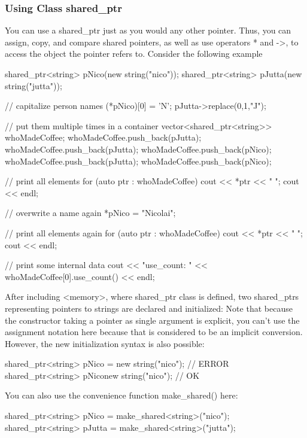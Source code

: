 \documentclass{report}
\begin{document}
\subsubsection{Using Class shared\_ptr}
\bigbreak \noindent 
You can use a shared\_ptr just as you would any other pointer. Thus, you can assign, copy, and
compare shared pointers, as well as use operators * and ->, to access the object the pointer refers to.
Consider the following example
\bigbreak \noindent 
\begin{cppcode}
    shared_ptr<string> pNico(new string("nico"));
    shared_ptr<string> pJutta(new string("jutta"));

    // capitalize person names
    (*pNico)[0] = 'N';
    pJutta->replace(0,1,"J");

    // put them multiple times in a container
    vector<shared_ptr<string>> whoMadeCoffee;
    whoMadeCoffee.push_back(pJutta);
    whoMadeCoffee.push_back(pJutta);
    whoMadeCoffee.push_back(pNico);
    whoMadeCoffee.push_back(pJutta);
    whoMadeCoffee.push_back(pNico);

    // print all elements
    for (auto ptr : whoMadeCoffee) {
        cout << *ptr << " ";
    }
    cout << endl;

    // overwrite a name again
    *pNico = "Nicolai";

    // print all elements again
    for (auto ptr : whoMadeCoffee) {
        cout << *ptr << " ";
    }
    cout << endl;

    // print some internal data
    cout << "use_count: " << whoMadeCoffee[0].use_count() << endl;
\end{cppcode}
\bigbreak \noindent 
After including <memory>, where shared\_ptr class is defined, two shared\_ptrs representing pointers to strings are declared and initialized:
\bigbreak \noindent 
Note that because the constructor taking a pointer as single argument is explicit, you can’t use the assignment notation here because that is considered to be an implicit conversion. However, the new initialization syntax is also possible:
\bigbreak \noindent 
\begin{cppcode}
shared_ptr<string> pNico = new string("nico"); // ERROR
shared_ptr<string> pNico{new string("nico")}; // OK
\end{cppcode}
\bigbreak \noindent 
You can also use the convenience function make\_shared() here:
\bigbreak \noindent 
\begin{cppcode}
shared_ptr<string> pNico = make_shared<string>("nico");
shared_ptr<string> pJutta = make_shared<string>("jutta");
\end{cppcode}
\end{document}

